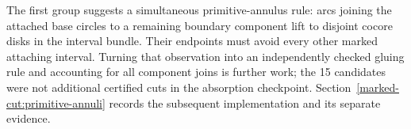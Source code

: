 The first group suggests a simultaneous primitive-annulus rule: arcs joining
the attached base circles to a remaining boundary component lift to disjoint
cocore disks in the interval bundle. Their endpoints must avoid every other
marked attaching interval. Turning that observation into an independently
checked gluing rule and accounting for all component joins is further work;
the 15 candidates were not additional certified cuts in the absorption
checkpoint. Section~\ref{marked-cut:primitive-annuli} records the subsequent
implementation and its separate evidence.
